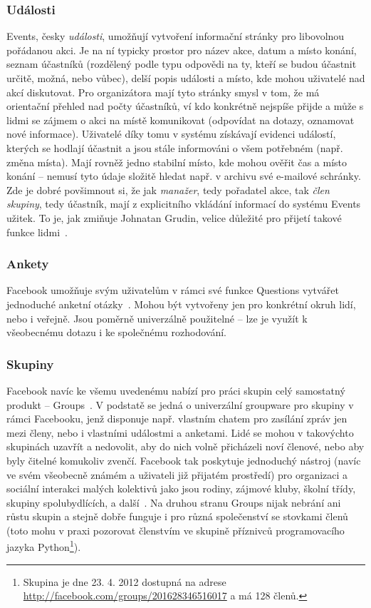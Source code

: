 \documentclass[12pt,oneside,final]{fithesis2}
\begin{document}
\subsubsection*{Události}
Events, česky \emph{události}, umožňují vytvoření informační stránky pro libovolnou pořádanou akci. Je na ní typicky prostor pro název akce, datum a místo konání, seznam účastníků (rozdělený podle typu odpovědi na ty, kteří se budou účastnit určitě, možná, nebo vůbec), delší popis události a místo, kde mohou uživatelé nad akcí diskutovat. Pro organizátora mají tyto stránky smysl v tom, že má orientační přehled nad počty účastníků, ví kdo konkrétně nejspíše přijde a může s lidmi se zájmem o akci na místě komunikovat (odpovídat na dotazy, oznamovat nové informace). Uživatelé díky tomu v systému získávají evidenci událostí, kterých se hodlají účastnit a jsou stále informováni o všem potřebném (např. změna místa). Mají rovněž jedno stabilní místo, kde mohou ověřit čas a místo konání -- nemusí tyto údaje složitě hledat např. v archivu své e-mailové schránky. Zde je dobré povšimnout si, že jak \emph{manažer}, tedy pořadatel akce, tak \emph{člen skupiny}, tedy účastník, mají z explicitního vkládání informací do systému Events užitek. To je, jak zmiňuje Johnatan Grudin, velice důležité pro přijetí takové funkce lidmi~\cite{grudin1994groupware}.

\subsubsection*{Ankety}
Facebook umožňuje svým uživatelům v rámci své funkce Questions vytvářet jednoduché anketní otázky~\cite{graham2011the}. Mohou být vytvořeny jen pro konkrétní okruh lidí, nebo i veřejně. Jsou poměrně univerzálně použitelné -- lze je využít k všeobecnému dotazu i ke společnému rozhodování.

\subsubsection*{Skupiny}
Facebook navíc ke všemu uvedenému nabízí pro práci skupin celý samostatný produkt -- Groups~\cite{chai2010new}. V podstatě se jedná o univerzální groupware pro skupiny v rámci Facebooku, jenž disponuje např. vlastním chatem pro zasílání zpráv jen mezi členy, nebo i vlastními událostmi a anketami. Lidé se mohou v takovýchto skupinách uzavřít a nedovolit, aby do nich volně přicházeli noví členové, nebo aby byly čitelné komukoliv zvenčí. Facebook tak poskytuje jednoduchý nástroj (navíc ve svém všeobecně známém a uživateli již přijatém prostředí) pro organizaci a sociální interakci malých kolektivů jako jsou rodiny, zájmové kluby, školní třídy, skupiny spolubydlících, a další~\cite{novati2012introducing}. Na druhou stranu Groups nijak nebrání ani růstu skupin a stejně dobře funguje i pro různá společenství se stovkami členů (toto mohu v praxi pozorovat členstvím ve skupině příznivců programovacího jazyka Python\footnote{Skupina je dne 23. 4. 2012 dostupná na adrese \url{http://facebook.com/groups/201628346516017} a má 128 členů.}).
\end{document}
